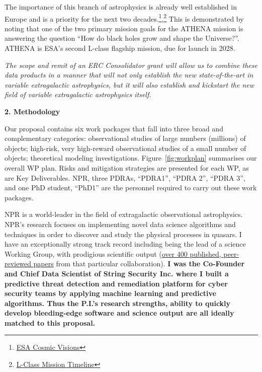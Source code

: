 \documentclass[oneside, a4paper, onecolumn, 11pt]{article}
\begin{document}
\smallskip
\smallskip
\noindent
The importance of this branch of astrophysics is already well
established in Europe and is a priority for the next two
decades.\footnote{\href{http://sci.esa.int/cosmic-vision}{ESA Cosmic
Visions}},\footnote{\href{http://sci.esa.int/cosmic-vision/42369-l-class-timeline/}{L-Class
Mission Timeline}} This is demonstrated by noting that one of the two
primary mission goals for the ATHENA mission is answering the question
``How do black holes grow and shape the Universe?''.  ATHENA is ESA's
second L-class flagship mission, due for launch in 2028.

\smallskip
\smallskip
\noindent
{\it The scope and remit of an ERC Consolidator grant will allow us to
combine these data products in a manner that will not only establish
the new state-of-the-art in variable extragalactic astrophysics, but it 
will also establish and kickstart the new field of variable extragalactic
astrophysics itself.}




\medskip
\medskip
\noindent
\large
{\bf{\textcolor{Cerulean}{2. Methodology}}}
\normalsize

\noindent
Our proposal contains six work packages that fall into three broad and
complementary categories: observational studies of large numbers
(millions) of objects; high-risk, very high-reward observational
studies of a small number of objects; theoretical modeling
investigations. Figure~\ref{fig:workplan} summarises our overall WP
plan. Risks and mitigation strategies are presented for each WP, as
are Key Deliverables.  NPR, three PDRAs, ``PDRA1'', ``PDRA 2'', ``PDRA
3'', and one PhD student, ``PhD1'' are the personnel required to carry
out these work packages.


\smallskip
\smallskip
\noindent
NPR is a world-leader in the field of extragalactic observational
astrophysics. NPR's research focuses on implementing novel data
science algorithms and techniques in order to discover and study the
physical processes in quasars. I have an exceptionally strong track
record including being the lead of a science Working Group, with
prodigious scientific output (\href{https://tinyurl.com/ycxd8lb6}{over
400 published, peer-reviewed papers} from that particular
collaboration). {\bf I was the Co-Founder and Chief Data Scientist of
String Security Inc. where I built a predictive threat detection and
remediation platform for cyber security teams by applying machine
learning and predictive algorithms.  Thus the P.I.'s research
strengths, ability to quickly develop bleeding-edge software and
science output are all ideally matched to this proposal.}
\end{document}
